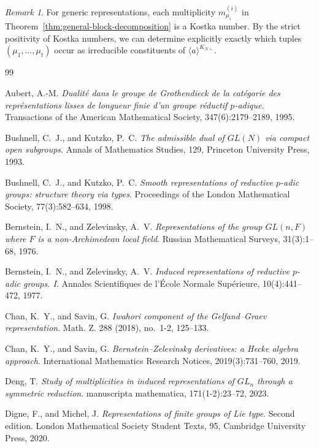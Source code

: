 \documentclass[12pt]{article}
\theoremstyle{remark}
\newtheorem{remark}[theorem]{Remark}
\begin{document}
\begin{remark}
For generic representations, each multiplicity $m^{(i)}_{\mu_i}$ in Theorem~\ref{thm:general-block-decomposition} is a Kostka number. By the strict positivity of Kostka numbers, we can determine explicitly exactly which tuples $(\mu_1,\dots,\mu_t)$ occur as irreducible constituents of $\langle a \rangle^{K_{N+}}$.
\end{remark}

\begin{thebibliography}{99}

Aubert, A.-M.
\emph{Dualit\'e dans le groupe de Grothendieck de la cat\'egorie des repr\'esentations lisses de longueur finie d'un groupe r\'eductif $p$-adique}.
Transactions of the American Mathematical Society, 347(6):2179--2189, 1995.

Bushnell, C.~J., and Kutzko, P.~C.
\emph{The admissible dual of $GL(N)$ via compact open subgroups}.
Annals of Mathematics Studies, 129, Princeton University Press, 1993.

Bushnell, C.~J., and Kutzko, P.~C.
\emph{Smooth representations of reductive $p$-adic groups: structure theory via types}.
Proceedings of the London Mathematical Society, 77(3):582--634, 1998.

Bernstein, I.~N., and Zelevinsky, A.~V.
\emph{Representations of the group $GL(n,F)$ where $F$ is a non-Archimedean local field}.
Russian Mathematical Surveys, 31(3):1--68, 1976.

Bernstein, I.~N., and Zelevinsky, A.~V.
\emph{Induced representations of reductive $p$-adic groups. I}.
Annales Scientifiques de l'\'Ecole Normale Sup\'erieure, 10(4):441--472, 1977.

Chan, K.~Y., and Savin, G.
\emph{Iwahori component of the Gelfand--Graev representation}.
Math. Z. 288 (2018), no.~1-2, 125--133.

Chan, K.~Y., and Savin, G.
\emph{Bernstein--Zelevinsky derivatives: a Hecke algebra approach}.
International Mathematics Research Notices, 2019(3):731--760, 2019.

Deng, T.
\emph{Study of multiplicities in induced representations of $GL_n$ through a symmetric reduction}.
manuscripta mathematica, 171(1-2):23--72, 2023.

Digne, F., and Michel, J.
\emph{Representations of finite groups of Lie type}.
Second edition. London Mathematical Society Student Texts, 95, Cambridge University Press, 2020.


\end{thebibliography}
\end{document}
